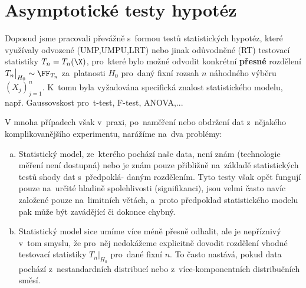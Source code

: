 \chapter{Asymptotické testy hypotéz}

Doposud jsme pracovali převážně s~formou testů statistických hypotéz, které využívaly odvozené (UMP,UMPU,LRT) nebo jinak odůvodněné (RT) testovací statistiky $T_n=T_n(\X)$, pro~které bylo možné odvodit konkrétní \textbf{přesné} rozdělení $T_n\big|_{H_0}\sim\FF_{T_n}$ za~platnosti $H_0$ pro~daný fixní rozsah $n$ náhodného výběru $(X_j)_{j=1}^n$. K~tomu byla vyžadována specifická znalost statistického modelu, např. Gaussovskost pro~t-test, F-test, ANOVA,...

V mnoha případech však v~praxi, po~naměření nebo obdržení dat z~nějakého komplikovanějšího experimentu, narážíme na~dva problémy:
\begin{enumerate}[a)]
	\item Statistický model, ze~kterého pochází naše data, není znám (technologie měření není dostupná) nebo je znám pouze přibližně na~základě statistických testů shody dat s~předpoklá- daným rozdělením. Tyto testy však opět fungují pouze na~určité hladině spolehlivosti (signifikanci), jsou velmi často navíc založené pouze na~limitních větách, a~proto předpoklad statistického modelu pak může být zavádějící či dokonce chybný.
	\item Statistický model sice umíme více méně přesně odhalit, ale je nepříznivý v~tom smyslu, že pro~něj nedokážeme explicitně dovodit rozdělení vhodné testovací statistiky $T_n\big|_{H_0}$ pro~dané fixní $n$. To často nastává, pokud data pochází z~nestandardních distribucí nebo z~více-komponentních distribučních směsí.
\end{enumerate}

